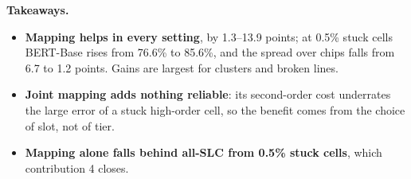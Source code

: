 \documentclass[10pt,a4paper]{article}
\begin{document}
\begin{table}[H]
\centering\small
\caption{Paired gain of fault-aware mapping over no mitigation (hybrid, magnitude, 20\% SLC), and of joint
tier-and-slot mapping over fault-aware mapping, in accuracy points (mean $\pm$ s.e. over 10 chips).}\label{t:mapgain}
\setlength{\tabcolsep}{3.5pt}
\end{table}

\noindent\textbf{Takeaways.}
\begin{itemize}
\item \textbf{Mapping helps in every setting}, by 1.3--13.9 points; at 0.5\% stuck cells BERT-Base rises from
76.6\% to 85.6\%, and the spread over chips falls from 6.7 to 1.2 points. Gains are largest for clusters and
broken lines.
\item \textbf{Joint mapping adds nothing reliable}: its second-order cost underrates the large error of a stuck
high-order cell, so the benefit comes from the choice of slot, not of tier.
\item \textbf{Mapping alone falls behind all-SLC from 0.5\% stuck cells}, which contribution 4 closes.
\end{itemize}
\end{document}
